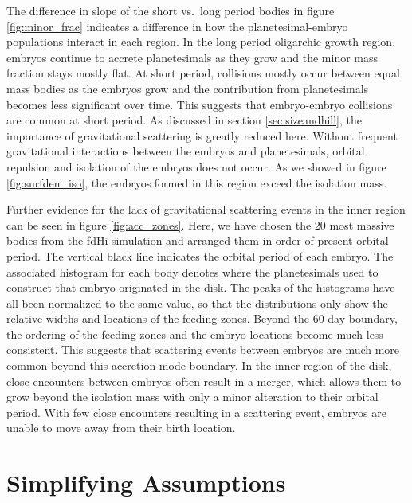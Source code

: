 \documentclass[twocolumn]{aastex63}
\begin{document}
The difference in slope of the short vs.\ long period bodies in figure \ref{fig:minor_frac} indicates a difference in how the planetesimal-embryo populations interact in each region. In the long period oligarchic growth region, embryos continue to accrete planetesimals as they grow and the minor mass fraction stays mostly flat. At short period, collisions mostly occur between equal mass bodies as the embryos grow and the contribution from planetesimals becomes less significant over time. This suggests that embryo-embryo collisions are common at short period. As discussed in section \ref{sec:sizeandhill}, the importance of gravitational scattering is greatly reduced here. Without frequent gravitational interactions between the embryos and planetesimals, orbital repulsion \citep{kokubo98} and isolation of the embryos does not occur. As we showed in figure \ref{fig:surfden_iso}, the embryos formed in this region exceed the isolation mass.

Further evidence for the lack of gravitational scattering events in
the inner region can be seen in figure \ref{fig:acc_zones}. Here, we
have chosen the 20 most massive bodies from the fdHi simulation and
arranged them in order of present orbital period. The vertical black
line indicates the orbital period of each embryo. The associated
histogram for each body denotes where the planetesimals used to
construct that embryo originated in the disk. The peaks of the
histograms have all been normalized to the same value, so that the
distributions only show the relative widths and locations of the
feeding zones. Beyond the 60 day boundary, the ordering of the feeding
zones and the embryo locations become much less consistent. This
suggests that scattering events between embryos are much more common
beyond this accretion mode boundary. In the inner region of the disk,
close encounters between embryos often result in a merger, which
allows them to grow beyond the isolation mass with only a minor alteration to their orbital period. With few close encounters resulting in a scattering event, embryos are unable to move away from their birth location.


\section{Simplifying Assumptions}\label{sec:assump}
\end{document}
